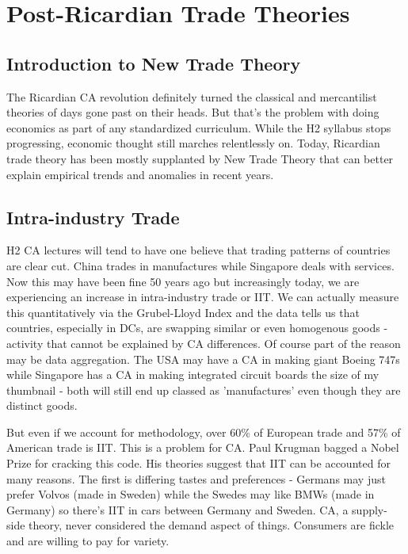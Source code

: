 \section{Post-Ricardian Trade Theories}
\subsection{Introduction to New Trade Theory}
The Ricardian CA revolution definitely turned the classical and mercantilist theories of days gone past on their heads. But that's the problem with doing economics as part of any standardized curriculum. While the H2 syllabus stops progressing, economic thought still marches relentlessly on. Today, Ricardian trade theory has been mostly supplanted by New Trade Theory that can better explain empirical trends and anomalies in recent years.
\subsection{Intra-industry Trade}
H2 CA lectures will tend to have one believe that trading patterns of countries are clear cut. China trades in manufactures while Singapore deals with services. Now this may have been fine 50 years ago but increasingly today, we are experiencing an increase in intra-industry trade or IIT. We can actually measure this quantitatively via the Grubel-Lloyd Index and the data tells us that countries, especially in DCs, are swapping similar or even homogenous goods - activity that cannot be explained by CA differences. Of course part of the reason may be data aggregation. The USA may have a CA in making giant Boeing 747s while Singapore has a CA in making integrated circuit boards the size of my thumbnail - both will still end up classed as 'manufactures' even though they are distinct goods.

But even if we account for methodology, over 60\% of European trade and 57\% of American trade is IIT. This is a problem for CA. Paul Krugman bagged a Nobel Prize for cracking this code. His theories suggest that IIT can be accounted for many reasons. The first is differing tastes and preferences - Germans may just prefer Volvos (made in Sweden) while the Swedes may like BMWs (made in Germany) so there's IIT in cars between Germany and Sweden. CA, a supply-side theory, never considered the demand aspect of things. Consumers are fickle and are willing to pay for variety.

